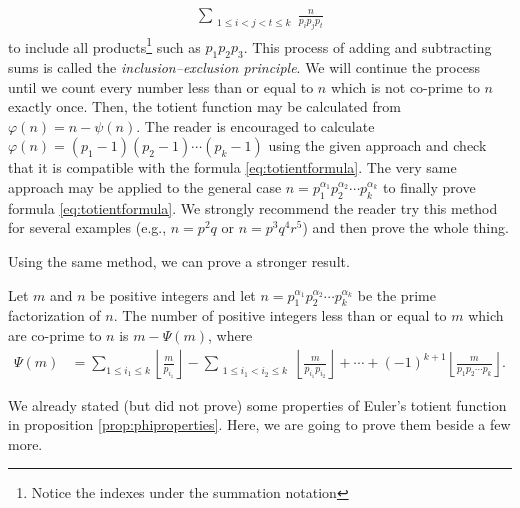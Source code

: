 \documentclass[12pt]{subfile}
\begin{document}
			\begin{align*}
				\sum\limits_{\substack{1\leq i<j<t\leq k}} \frac{n}{p_ip_jp_t}
			\end{align*}
		to include all products\footnote{Notice the indexes under the summation notation} such as $p_1p_2p_3$. This process of adding and subtracting sums is called the \textit{inclusion--exclusion principle}. We will continue the process until we count every number less than or equal to $n$ which is not co-prime to $n$ exactly once. Then, the totient function may be calculated from $\varphi(n) = n - \psi(n)$. The reader is encouraged to calculate $\varphi(n) = (p_1-1)(p_2-1) \cdots (p_k-1)$ using the given approach and check that it is compatible with the formula \ref{eq:totientformula}. The very same approach may be applied to the general case $n= p_1^{\alpha_1} p_2^{\alpha_2} \cdots p_k^{\alpha_k}$ to finally prove formula \ref{eq:totientformula}. We strongly recommend the reader try this method for several examples (e.g., $n=p^2q$ or $n = p^3 q^4r^5$) and then prove the whole thing.

		Using the same method, we can prove a stronger result.

		\begin{theorem}
			Let $m$ and $n$ be positive integers and let $n= p_1^{\alpha_1} p_2^{\alpha_2} \cdots p_k^{\alpha_k}$ be the prime factorization of $n$. The number of positive integers less than or equal to $m$ which are co-prime to $n$ is $m - \Psi(m)$, where
			\begin{align*}
			\Psi(m) &= \sum_{1 \leq i_1 \leq k} \left\lfloor\frac{m}{p_{i_1}} \right\rfloor - \sum_{\substack{1 \leq i_1<i_2 \leq k}} \left\lfloor\frac{m}{p_{i_1}p_{i_2}} \right\rfloor + \cdots + (-1)^{k+1} \left\lfloor\frac{m}{p_1p_2\cdots p_k} \right\rfloor.
			\end{align*}
		\end{theorem}
		We already stated (but did not prove) some properties of Euler's totient function in proposition \ref{prop:phiproperties}. Here, we are going to prove them beside a few more.
\end{document}
